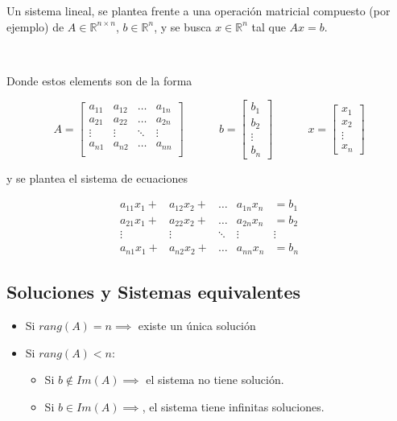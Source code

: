 
Un sistema lineal, se plantea frente a una operación matricial compuesto (por ejemplo) de $A \in \mathbb{R}^{n\times n}$, $b \in \mathbb{R}^{n}$, y se busca $x \in \mathbb{R}^{n}$ tal que $Ax = b$.

\

Donde estos elements son de la forma

\[
A = 
\begin{bmatrix}
a_{11} & a_{12} & \ldots & a_{1n} \\
a_{21} & a_{22} & \ldots & a_{2n} \\
\vdots & \vdots & \ddots & \vdots \\
a_{n1} & a_{n2} & \ldots & a_{nn} \\
\end{bmatrix}
~~~~~~~~~~~~~~
b =
\begin{bmatrix}
b_1 \\
b_2 \\
\vdots \\
b_n 
\end{bmatrix}
~~~~~~~~~~~~~~
x = 
\begin{bmatrix}
x_1 \\
x_2 \\
\vdots \\
x_n
\end{bmatrix}
\]

y se plantea el sistema de ecuaciones

\[
\begin{matrix}
a_{11}x_{1} + & a_{12}x_{2} + & \ldots & a_{1n}x_n & = b_1 \\
a_{21}x_{1} + & a_{22}x_{2} + & \ldots & a_{2n}x_n & = b_2 \\
\vdots & \vdots & \ddots & \vdots & \vdots \\
a_{n1}x_{1} + & a_{n2}x_{2} + & \ldots & a_{nn}x_n & = b_n
\end{matrix}
\]

\subsection{Soluciones y Sistemas equivalentes}
\label{subsec:soluciones_y_sistemas_equivalentes}


\begin{itemize}
    \item Si $rang(A) = n \implies$ existe un única solución
    \item Si $rang(A) < n$:
    \begin{itemize}
        \item Si $b \notin Im(A) \implies$ el sistema no tiene solución.
        \item Si $b \in Im(A) \implies$, el sistema tiene infinitas soluciones. 
    \end{itemize}
\end{itemize}

